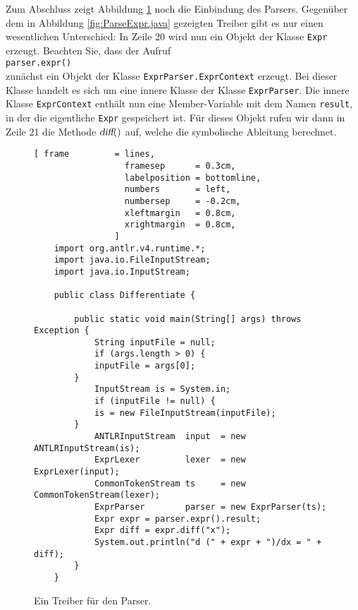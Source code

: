 Zum Abschluss zeigt Abbildung \ref{fig:Differentiate.java} noch die Einbindung des Parsers.
Gegen\"uber dem in Abbildung \ref{fig:ParseExpr.java} gezeigten Treiber gibt es nur einen
wesentlichen Unterschied: In Zeile 20 wird nun ein Objekt der Klasse \texttt{Expr} erzeugt.
Beachten Sie, dass der Aufruf
\\[0.2cm]
\hspace*{1.3cm}
\texttt{parser.expr()}
\\[0.2cm]
zun\"achst ein Objekt der Klasse \texttt{ExprParser.ExprContext} erzeugt.  Bei dieser Klasse handelt
es sich um eine innere Klasse der Klasse \texttt{ExprParser}.  Die innere Klasse
\texttt{ExprContext} enth\"alt nun eine Member-Variable mit dem Namen \texttt{result}, in der die
eigentliche \texttt{Expr} gespeichert ist.  
F\"ur dieses Objekt rufen wir dann in Zeile 21 die Methode $\textsl{diff}()$ auf, welche die
symbolische Ableitung berechnet.


\begin{figure}[!ht]
\centering
\begin{Verbatim}[ frame         = lines, 
                  framesep      = 0.3cm, 
                  labelposition = bottomline,
                  numbers       = left,
                  numbersep     = -0.2cm,
                  xleftmargin   = 0.8cm,
                  xrightmargin  = 0.8cm,
                ]
    import org.antlr.v4.runtime.*;
    import java.io.FileInputStream;
    import java.io.InputStream;
    
    public class Differentiate {
    
        public static void main(String[] args) throws Exception {
            String inputFile = null; 
            if (args.length > 0) { 
    	    inputFile = args[0];
    	}
            InputStream is = System.in;
            if (inputFile != null) {
    	    is = new FileInputStream(inputFile);
    	}
            ANTLRInputStream  input  = new ANTLRInputStream(is);
            ExprLexer         lexer  = new ExprLexer(input);
            CommonTokenStream ts     = new CommonTokenStream(lexer);
            ExprParser        parser = new ExprParser(ts);
            Expr expr = parser.expr().result;
            Expr diff = expr.diff("x");
            System.out.println("d (" + expr + ")/dx = " + diff);
        }
    }
\end{Verbatim}
\vspace*{-0.3cm}
\caption{Ein Treiber f\"ur den Parser.}
\label{fig:Differentiate.java}
\end{figure}
\pagebreak


